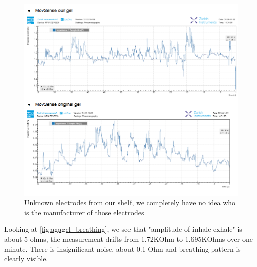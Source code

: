 \begin{figure}
    \centering
    \includegraphics[width=1.2\linewidth]{figures/PlaceHolders/MovSense_Placeholder.png}
    \caption{Unknown electrodes from our shelf, we completely have no idea who is the manufacturer of those electrodes}
    \label{fig:movsense_breathing}
\end{figure}

Looking at \ref{fig:agagcl_breathing}, we see that "amplitude of inhale-exhale" is about 5 ohms, the measurement drifts from 1.72KOhm to 1.695KOhms over one minute. There is insignificant noise, about 0.1 Ohm and breathing pattern is clearly visible.





